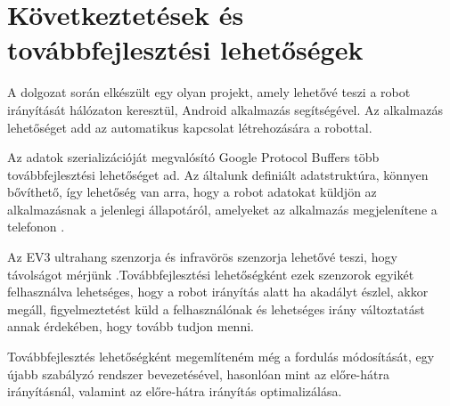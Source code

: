 \chapter{Következtetések és továbbfejlesztési lehetőségek}
A dolgozat során elkészült egy olyan projekt, amely lehetővé teszi a robot irányítását hálózaton keresztül, Android alkalmazás segítségével. Az alkalmazás lehetőséget add az automatikus kapcsolat létrehozására a robottal.

Az adatok szerializációját megvalósító Google Protocol Buffers több továbbfejlesztési lehetőséget ad. Az általunk definiált adatstruktúra, könnyen bővíthető, így lehetőség van arra, hogy a robot adatokat küldjön az alkalmazásnak a jelenlegi állapotáról, amelyeket az alkalmazás megjelenítene a telefonon . 

Az EV3 ultrahang szenzorja és infravörös szenzorja lehetővé teszi, hogy távolságot mérjünk .Továbbfejlesztési lehetőségként ezek szenzorok egyikét felhasználva lehetséges, hogy a robot irányítás alatt ha akadályt észlel, akkor megáll, figyelmeztetést küld a felhasználónak és lehetséges irány változtatást annak érdekében, hogy tovább tudjon menni.

Továbbfejlesztés lehetőségként megemlíteném még a fordulás módosítását, egy újabb szabályzó rendszer bevezetésével, hasonlóan mint az előre-hátra irányításnál, valamint az előre-hátra irányítás optimalizálása.



